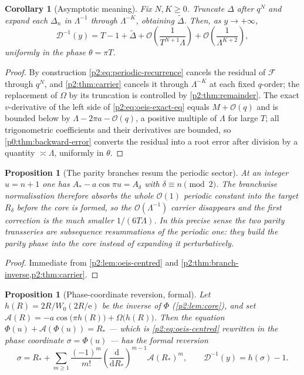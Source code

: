 \documentclass[11pt,a4paper,oneside]{book}
\theoremstyle{plain}
\newtheorem{proposition}[theorem]{Proposition}
\newtheorem{corollary}[theorem]{Corollary}
\theoremstyle{definition}
\theoremstyle{remark}
\newcommand{\e}{\mathrm{e}}
\newcommand{\dd}{\mathrm{d}}
\newcommand{\bigO}{\mathcal{O}}
\newcommand{\Wlam}{W}
\begin{document}
\begin{corollary}[Asymptotic meaning]
\label{p2:cor:periodic-meaning}
Fix \(N,K\ge0\).  Truncate \(\Delta\) after \(q^N\) and expand each
\(\Delta_n\) in \(\Lambda^{-1}\) through \(\Lambda^{-K}\), obtaining
\(\widetilde\Delta\).  Then, as \(y\to+\infty\),
\begin{equation}
 \mathscr D^{-1}(y)
 =T-1+\widetilde\Delta
 +\bigO\!\left(\frac1{T^{N+1}\Lambda}\right)
 +\bigO\!\left(\frac1{\Lambda^{K+2}}\right),
 \label{p2:eq:oeis-inverse}
\end{equation}
uniformly in the phase \(\theta=\pi T\).
\end{corollary}

\begin{proof}
By construction \cref{p2:eq:periodic-recurrence} cancels the residual of
\(\mathcal F\) through \(q^N\), and \cref{p2:thm:carrier} cancels it through
\(\Lambda^{-K}\) at each fixed \(q\)-order; the replacement of \(\Omega\) by
its truncation is controlled by \cref{p2:thm:remainder}.  The exact
\(v\)-derivative of the left side of \cref{p2:eq:oeis-exact-eq} equals
\(M+\bigO(q)\) and is bounded below by \(\Lambda-2\pi a-\bigO(q)\), a positive
multiple of \(\Lambda\) for large \(T\); all trigonometric coefficients and
their derivatives are bounded, so \cref{p0:thm:backward-error} converts the
residual into a root error after division by a quantity \(\asymp\Lambda\),
uniformly in \(\theta\).
\end{proof}

\begin{proposition}[The parity branches resum the periodic sector]
\label{p2:prop:resummation}
At an integer \(u=n+1\) one has \(A_*-a\cos\pi u=A_\delta\) with
\(\delta\equiv n\pmod2\).  The branchwise normalisation therefore absorbs the
whole \(\bigO(1)\) periodic constant into the target \(R_\delta\) before the
core is formed, so the \(\bigO(\Lambda^{-1})\) carrier disappears and the first
correction is the much smaller \(1/(6T\Lambda)\).  In this precise sense the two
parity transseries are subsequence resummations of the periodic one: they build
the parity phase into the core instead of expanding it perturbatively.
\end{proposition}

\begin{proof}
Immediate from \cref{p2:lem:oeis-centred} and
\cref{p2:thm:branch-inverse,p2:thm:carrier}.
\end{proof}

\begin{proposition}[Phase-coordinate reversion, formal]
\label{p2:prop:phase-reversion}
Let \(h(R)=2R/\Wlam_0(2R/\e)\) be the inverse of \(\Phi\)
(\cref{p2:lem:core}), and set
\(\mathcal A(R)=-a\cos\bigl(\pi h(R)\bigr)+\Omega\bigl(h(R)\bigr)\).  Then the
equation \(\Phi(u)+\mathcal A(\Phi(u))=R_*\) --- which is
\cref{p2:eq:oeis-centred} rewritten in the phase coordinate
\(\sigma=\Phi(u)\) --- has the formal reversion
\begin{equation}
 \sigma=R_*+\sum_{m\ge1}\frac{(-1)^m}{m!}
 \left(\frac{\dd}{\dd R_*}\right)^{m-1}\mathcal A(R_*)^m,
 \qquad
 \mathscr D^{-1}(y)=h(\sigma)-1 .
 \label{p2:eq:phase-reversion}
\end{equation}
\end{proposition}
\end{document}
